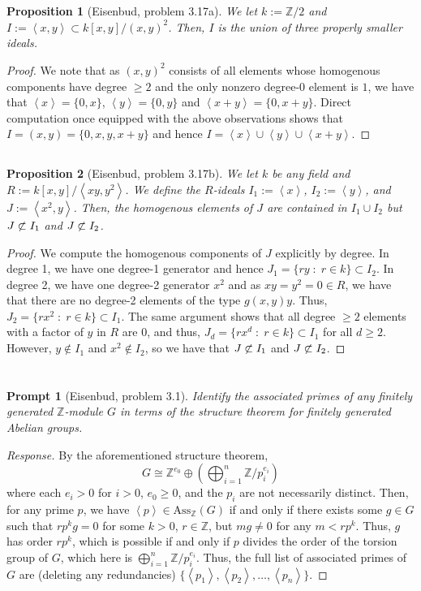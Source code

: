 \documentclass[english]{article}
\newcommand{\ZZ}{\mathbb{Z}}
\newcommand{\prob}[1]{\setcounter{section}{#1-1}\section{}}
\newcommand{\prt}[1]{\setcounter{subsection}{#1-1}\subsection{}}
\newtheorem*{prop*}{Proposition}
\newtheorem*{prompt*}{Prompt}
\theoremstyle{remark}
\theoremstyle{definition}
\newcommand{\idl}[1]{\left\langle{#1}\right\rangle }
\newcommand{\ass}{\mathrm{Ass}}
\begin{document}
\prob{7}
\prt{1}\begin{prop*}[Eisenbud, problem 3.17a]
We let $k:=\ZZ/2$ and $I:=\idl{x,y}\subset k[x,y]/(x,y)^2$. Then, $I$ is the union of three properly smaller ideals. 
\end{prop*}
\begin{proof}
We note that as $(x,y)^2$ consists of all elements whose homogenous components have degree $\geq 2$ and the only nonzero degree-0 element is $1$, we have that $\idl{x}=\{0,x\}$, $\idl{y}=\{0,y\}$ and $\idl{x+y}=\{0,x+y\}$. Direct computation once equipped with the above observations shows that $I=(x,y)=\{0,x,y,x+y\}$ and hence $I=\idl{x}\cup \idl{y}\cup \idl{x+y}$.
\end{proof}
\prt{2}\begin{prop*}[Eisenbud, problem 3.17b]
We let $k$ be any field and $R:=k[x,y]/\idl{xy,y^2}$. We define the $R$-ideals $I_1:=\idl{x}$, $I_2:=\idl{y}$, and $J:=\idl{x^2,y }$. Then, the homogenous elements of $J$ are contained in $I_1\cup I_2$ but $J\centernot\subset I_1$ and $J\centernot\subset I_2$. 
\end{prop*}
\begin{proof}
	We compute the homogenous components of $J$ explicitly by degree. In degree 1, we have one degree-1 generator and hence $J_1=\{ry\;:\;r\in k\}\subset I_2$. In degree 2, we have one degree-2 generator $x^2$ and as $xy=y^2=0\in R$, we have that there are no degree-2 elements of the type $g(x,y)y$. Thus, $J_{2}=\{rx^2\;:\;r\in k\}\subset I_1$. The same argument shows that all degree $\geq 2$ elements with a factor of $y$ in $R$ are $0$, and thus, $J_{d}=\{rx^d\;:\;r\in k\}\subset I_1$ for all $d\geq 2$. However, $y\not\in I_1$ and $x^2\notin I_2$, so we have that $J\centernot\subset I_1$ and $J\centernot\subset I_2$. 
\end{proof}
\prob{8}
\begin{prompt*}[Eisenbud, problem 3.1]
Identify the associated primes of any finitely generated $\ZZ$-module $G$ in terms of the structure theorem for finitely generated Abelian groups. 
\end{prompt*}\begin{proof}[Response]
By the aforementioned structure theorem, $$G\cong\ZZ^{e_0}\oplus\left( \bigoplus_{i=1}^n \ZZ/p_i^{e_i}\right)$$ where each $e_i>0$ for $i>0$, $e_0\geq 0$, and the $p_i$ are not necessarily distinct. Then, for any prime ${p}$, we have $\idl{p}\in \ass_\ZZ(G)$ if and only if there exists some $g\in G$ such that $rp^kg=0$ for some $k>0$, $r\in \ZZ$, but $mg\neq 0$ for any $m<rp^k$. Thus, $g$ has order $rp^k$, which is possible if and only if $p$ divides the order of the torsion group of $G$, which here is $\bigoplus_{i=1}^n \ZZ/p_i^{e_i}$. Thus, the full list of associated primes of $G$ are (deleting any redundancies) $\{\idl{p_1},\idl{p_2},\hdots,\idl{p_n}\}$.
\end{proof}
\end{document}
